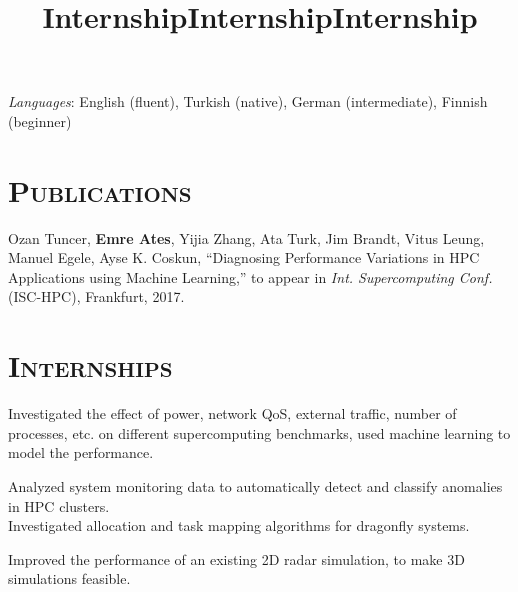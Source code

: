 \begin{resume}
	
	
	\emph{Languages}: English (fluent), Turkish (native), German (intermediate),
  Finnish (beginner) 

  \section{\textsc{Publications}}
  Ozan Tuncer, \textbf{Emre Ates}, Yijia Zhang, Ata Turk, Jim Brandt, Vitus
  Leung, Manuel Egele, Ayse K. Coskun, ``Diagnosing Performance Variations in
  HPC Applications using Machine Learning,'' to appear in \textit{Int.
    Supercomputing Conf.} (ISC-HPC), Frankfurt, 2017.
	
	\section{\textsc{Internships}}
	
	\title{Internship}
	\begin{position}
    Investigated the effect of power, network QoS, external traffic, number of
    processes, etc. on different supercomputing benchmarks, used machine
    learning to model the performance.
	\end{position}
	
	\title{Internship}
	\begin{position}
		Analyzed system monitoring data to automatically detect and classify
    anomalies in HPC clusters. \\
    Investigated allocation and task mapping algorithms for dragonfly systems.
	\end{position}
	
	\title{Internship}
	\begin{position}
		Improved the performance of an existing 2D radar simulation, to make 3D
    simulations feasible.
	\end{position}
	

\end{resume}
